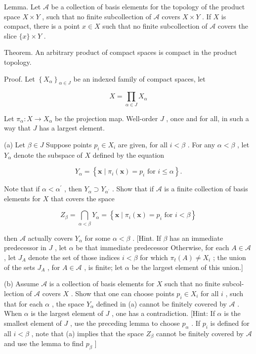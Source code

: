 \documentclass[10pt]{article}
\begin{document}
Lemma. Let \(\mathcal{A}\) be a collection of basis elements for the topology of the product space \(X \times  Y\) , such that no finite subcollection of \(\mathcal{A}\) covers \(X \times  Y\) . If \(X\) is compact, there is a point \(x \in  X\) such that no finite subcollection of \(\mathcal{A}\) covers the slice \(\{ x\}  \times  Y\) .

Theorem. An arbitrary product of compact spaces is compact in the product topology.

Proof. Let \({\left\{  {X}_{\alpha }\right\}  }_{\alpha  \in  J}\) be an indexed family of compact spaces, let

\[
X = \mathop{\prod }\limits_{{\alpha  \in  J}}{X}_{\alpha }
\]

Let \({\pi }_{\alpha } : X \rightarrow  {X}_{\alpha }\) be the projection map. Well-order \(J\) , once and for all, in such a way that \(J\) has a largest element.

(a) Let \(\beta  \in  J\) Suppose points \({p}_{i} \in  {X}_{i}\) are given, for all \(i < \beta\) . For any \(\alpha  < \beta\) , let \({Y}_{\alpha }\) denote the subspace of \(X\) defined by the equation

\[
{Y}_{\alpha } = \left\{  {\mathbf{x} \mid  {\pi }_{i}\left( \mathbf{x}\right)  = {p}_{i}\text{ for }i \leq  \alpha }\right\}  .
\]

Note that if \(\alpha  < {\alpha }^{\prime }\) , then \({Y}_{\alpha } \supset  {Y}_{{\alpha }^{\prime }}\) . Show that if \(\mathcal{A}\) is a finite collection of basis elements for \(X\) that covers the space

\[
{Z}_{\beta } = \mathop{\bigcap }\limits_{{\alpha  < \beta }}{Y}_{\alpha } = \left\{  {\mathbf{x} \mid  {\pi }_{i}\left( \mathbf{x}\right)  = {p}_{i}\text{ for }i < \beta }\right\}
\]

then \(\mathcal{A}\) actually covers \({Y}_{\alpha }\) for some \(\alpha  < \beta\) . [Hint. If \(\beta\) has an immediate predecessor in \(J\) , let \(\alpha\) be that immediate predecessor Otherwise, for each \(A \in  \mathcal{A}\) , let \({J}_{A}\) denote the set of those indices \(i < \beta\) for which \({\pi }_{t}\left( A\right)  \neq  {X}_{i}\) ; the union of the sets \({J}_{A}\) , for \(A \in  \mathcal{A}\) , is finite; let \(\alpha\) be the largest element of this union.]

(b) Assume \(\mathcal{A}\) is a collection of basis elements for \(X\) such that no finite subcol-lection of \(\mathcal{A}\) covers \(X\) . Show that one can choose points \({p}_{i} \in  {X}_{i}\) for all \(i\) , such that for each \(\alpha\) , the space \({Y}_{\alpha }\) defined in (a) cannot be finitely covered by \(\mathcal{A}\) . When \(\alpha\) is the largest element of \(J\) , one has a contradiction. [Hint: If \(\alpha\) is the smallest element of \(J\) , use the preceding lemma to choose \({p}_{\alpha }\) . If \({p}_{i}\) is defined for all \(i < \beta\) , note that (a) implies that the space \({Z}_{\beta }\) cannot be finitely covered by \(\mathcal{A}\) and use the lemma to find \({p}_{\beta }\) ]
\end{document}
